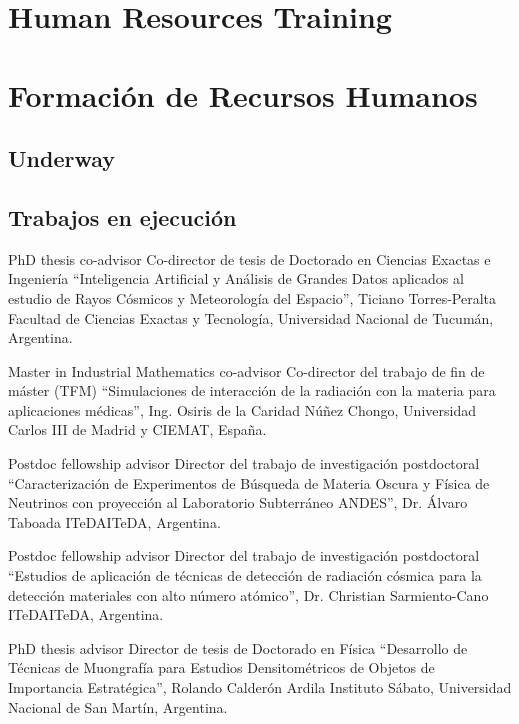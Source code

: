 \ifeng
\section*{Human Resources Training}
\else
\section*{Formación de Recursos Humanos}
\fi

\ifeng
	\subsection*{Underway}
\else
	\subsection*{Trabajos en ejecución}
\fi

\ifeng
PhD thesis co-advisor
\else
Co-director de tesis de Doctorado en Ciencias Exactas e Ingeniería 
\fi
``Inteligencia Artificial y Análisis de Grandes Datos aplicados al estudio de Rayos Cósmicos y Meteorología del Espacio'', Ticiano Torres-Peralta \at Facultad de Ciencias Exactas y Tecnología, Universidad Nacional de Tucumán, Argentina.

\ifeng
Master in Industrial Mathematics co-advisor
\else
Co-director del trabajo de fin de máster (TFM)
\fi
``Simulaciones de interacción de la radiación con la materia para aplicaciones médicas'', Ing. Osiris de la Caridad Núñez Chongo, Universidad Carlos III de Madrid y CIEMAT, España.

\ifeng
Postdoc fellowship advisor
\else
Director del trabajo de investigación postdoctoral
\fi
``Caracterización de Experimentos de Búsqueda de Materia Oscura y Física de Neutrinos con proyección al Laboratorio Subterráneo ANDES'', Dr. Álvaro Taboada \at \ifeng ITeDA\else ITeDA\fi, Argentina.

\ifeng
Postdoc fellowship advisor
\else
Director del trabajo de investigación postdoctoral
\fi
``Estudios de aplicación de técnicas de detección de radiación cósmica para la detección materiales con alto número atómico'', Dr. Christian Sarmiento-Cano \at \ifeng ITeDA\else ITeDA\fi, Argentina.

\ifeng
PhD thesis advisor
 \else
Director de tesis de Doctorado en Física
 \fi
``Desarrollo de Técnicas de Muongrafía para Estudios Densitométricos de Objetos de Importancia Estratégica'', Rolando Calderón Ardila \at Instituto Sábato, Universidad Nacional de San Martín, Argentina.

